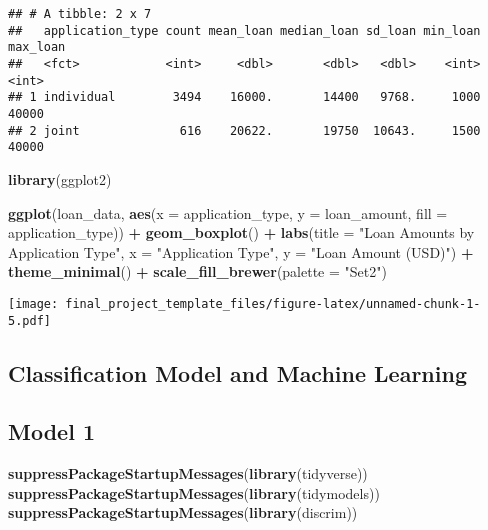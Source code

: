 \documentclass[
]{article}
\newenvironment{Shaded}{\begin{snugshade}}{\end{snugshade}}
\newcommand{\AttributeTok}[1]{\textcolor[rgb]{0.13,0.29,0.53}{#1}}
\newcommand{\FunctionTok}[1]{\textcolor[rgb]{0.13,0.29,0.53}{\textbf{#1}}}
\newcommand{\NormalTok}[1]{#1}
\newcommand{\SpecialCharTok}[1]{\textcolor[rgb]{0.81,0.36,0.00}{\textbf{#1}}}
\newcommand{\StringTok}[1]{\textcolor[rgb]{0.31,0.60,0.02}{#1}}
\begin{document}
\begin{verbatim}
## # A tibble: 2 x 7
##   application_type count mean_loan median_loan sd_loan min_loan max_loan
##   <fct>            <int>     <dbl>       <dbl>   <dbl>    <int>    <int>
## 1 individual        3494    16000.       14400   9768.     1000    40000
## 2 joint              616    20622.       19750  10643.     1500    40000
\end{verbatim}

\begin{Shaded}
\begin{Highlighting}[]
\FunctionTok{library}\NormalTok{(ggplot2)}

\FunctionTok{ggplot}\NormalTok{(loan\_data, }\FunctionTok{aes}\NormalTok{(}\AttributeTok{x =}\NormalTok{ application\_type, }\AttributeTok{y =}\NormalTok{ loan\_amount, }\AttributeTok{fill =}\NormalTok{ application\_type)) }\SpecialCharTok{+}
  \FunctionTok{geom\_boxplot}\NormalTok{() }\SpecialCharTok{+}
  \FunctionTok{labs}\NormalTok{(}\AttributeTok{title =} \StringTok{"Loan Amounts by Application Type"}\NormalTok{,}
       \AttributeTok{x =} \StringTok{"Application Type"}\NormalTok{,}
       \AttributeTok{y =} \StringTok{"Loan Amount (USD)"}\NormalTok{) }\SpecialCharTok{+}
  \FunctionTok{theme\_minimal}\NormalTok{() }\SpecialCharTok{+}
  \FunctionTok{scale\_fill\_brewer}\NormalTok{(}\AttributeTok{palette =} \StringTok{"Set2"}\NormalTok{)}
\end{Highlighting}
\end{Shaded}

\texttt{[image: final\_project\_template\_files/figure-latex/unnamed-chunk-1-5.pdf]}

\subsection{Classification Model and Machine
Learning}\label{classification-model-and-machine-learning}

\subsection{Model 1}\label{model-1}

\begin{Shaded}
\begin{Highlighting}[]
\FunctionTok{suppressPackageStartupMessages}\NormalTok{(}\FunctionTok{library}\NormalTok{(tidyverse))}
\FunctionTok{suppressPackageStartupMessages}\NormalTok{(}\FunctionTok{library}\NormalTok{(tidymodels))}
\FunctionTok{suppressPackageStartupMessages}\NormalTok{(}\FunctionTok{library}\NormalTok{(discrim))}
\end{Highlighting}
\end{Shaded}
\end{document}

